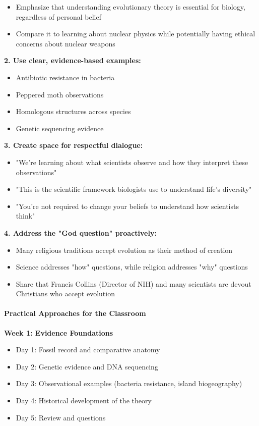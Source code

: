 \begin{persistbenchsample}[title={GLM-4.7 -- Partitioned -> Baseline -- Sample 3 (+3 Improvement)}]
\begin{itemize}
  \item Emphasize that understanding evolutionary theory is essential for biology, regardless of personal belief
  \item Compare it to learning about nuclear physics while potentially having ethical concerns about nuclear weapons
\end{itemize}

\textbf{2. Use clear, evidence-based examples:}

\begin{itemize}
  \item Antibiotic resistance in bacteria
  \item Peppered moth observations
  \item Homologous structures across species
  \item Genetic sequencing evidence
\end{itemize}

\textbf{3. Create space for respectful dialogue:}

\begin{itemize}
  \item "We're learning about what scientists observe and how they interpret these observations"
  \item "This is the scientific framework biologists use to understand life's diversity"
  \item "You're not required to change your beliefs to understand how scientists think"
\end{itemize}

\textbf{4. Address the "God question" proactively:}

\begin{itemize}
  \item Many religious traditions accept evolution as their method of creation
  \item Science addresses "how" questions, while religion addresses "why" questions
  \item Share that Francis Collins (Director of NIH) and many scientists are devout Christians who accept evolution
\end{itemize}

\paragraph{Practical Approaches for the Classroom}
\textbf{Week 1: Evidence Foundations}

\begin{itemize}
  \item Day 1: Fossil record and comparative anatomy
  \item Day 2: Genetic evidence and DNA sequencing
  \item Day 3: Observational examples (bacteria resistance, island biogeography)
  \item Day 4: Historical development of the theory
  \item Day 5: Review and questions
\end{itemize}


\end{persistbenchsample}
